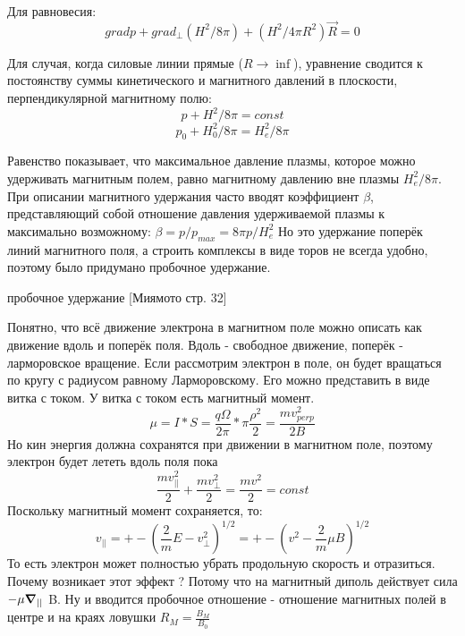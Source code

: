 \documentclass[10pt, a4paper]{article}
\begin{document}
Для равновесия: 
\begin{equation}
	\label{eq.Disp14.1.6}
 grad p + grad_{\perp}(H^{2}/8\pi)+(H^{2}/4\pi R^{2})\vec R =0
\end{equation}

Для случая, когда силовые линии прямые ($R\rightarrow \inf $), уравнение сводится к постоянству суммы кинетического и магнитного давлений в плоскости, перпендикулярной магнитному полю:
\begin{equation}
	\label{eq.Disp14.1.7}
p + H^{2}/8\pi=const
\end{equation}
\begin{equation}
	\label{eq.Disp14.1.8}
p_0 + H_{0}^{2}/8\pi=H_{e}^{2}/8\pi
\end{equation}

Равенство показывает, что максимальное давление плазмы, которое можно удерживать магнитным полем, равно магнитному давлению вне плазмы $H_{e}^{2}/8\pi$. При описании магнитного удержания часто вводят коэффициент $\beta$, представляющий собой
отношение давления удерживаемой плазмы к максимально возможному: $\beta=p/p_{max}=8\pi p/H_{e}^{2}$
Но это удержание поперёк линий магнитного поля, а строить комплексы в виде торов не всегда удобно, поэтому было придумано пробочное удержание.

пробочное удержание [Миямото стр. 32]

Понятно, что всё движение электрона в магнитном поле можно описать как движение вдоль и поперёк поля. Вдоль - свободное движение, поперёк - ларморовское вращение.
Если рассмотрим электрон в поле, он будет вращаться по кругу с радиусом равному Ларморовскому. Его можно представить в виде витка с током. У витка с током есть магнитный момент.
\begin{equation}
	\label{eq.Disp14.1.9}
 \mu=I*S=\frac{q\Omega}{2\pi} * \pi \frac{\rho^{2}}{2}=\frac{mv_{perp}^{2}}{2B}
\end{equation}	
Но кин энергия должна сохранятся при движении в магнитном поле, поэтому электрон будет лететь вдоль поля пока
\begin{equation}
	\label{eq.Disp14.1.10}
	\frac{mv_{||}^{2}}{2}+\frac{mv_{\perp}^{2}}{2}=\frac{mv^{2}}{2}=const
\end{equation}	
Поскольку магнитный момент сохраняется, то:
\begin{equation}
	\label{eq.Disp14.1.11}
 v_{||}=+-(\frac{2}{m}E-v_{\perp}^{2})^{1/2}=+-(v^{2}-\frac{2}{m} \mu B)^{1/2}
\end{equation}	
То есть электрон может полностью убрать продольную скорость и отразиться. Почему возникает этот эффект ? Потому что на магнитный диполь действует сила $-\mu \grad_{||}$ B. Ну и вводится пробочное отношение - отношение магнитных полей в центре и на краях ловушки $R_M=\frac{B_M}{B_0}$
\end{document}
